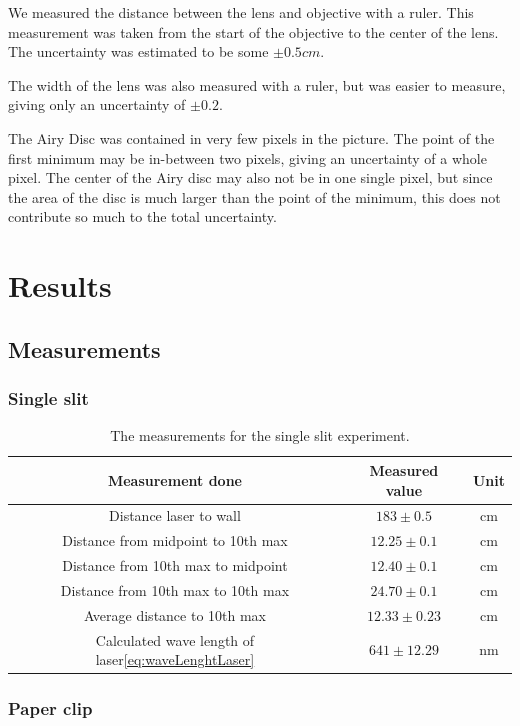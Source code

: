 \documentclass{emulateapj}
\begin{document}
We measured the distance between the lens and objective with a ruler. This measurement was taken from the start of the objective to the center of the lens. The uncertainty was estimated to be some $\pm 0.5 cm$.

The width of the lens was also measured with a ruler, but was easier to measure, giving only an uncertainty of $\pm 0.2$.

The Airy Disc was contained in very few pixels in the picture. The point of the first minimum may be in-between two pixels, giving an uncertainty of a whole pixel. The center of the Airy disc may also not be in one single pixel, but since the area of the disc is much larger than the point of the minimum, this does not contribute so much to the total uncertainty.

\section{Results}
\label{sec:results}

\subsection{Measurements}
\subsubsection{Single slit}

\begin{table}[H]
\begin{tabular}{ c c c }
Measurement done & Measured value & Unit\\
\hline
Distance laser to wall & $183 \pm 0.5$ & cm \\
Distance from midpoint to 10th max & $12.25 \pm 0.1$ & cm\\
Distance from 10th max to midpoint & $12.40 \pm 0.1$ & cm\\
Distance from 10th max to 10th max & $24.70 \pm 0.1$ & cm\\
Average distance to 10th max & $12.33 \pm 0.23$ & cm\\
Calculated wave length of laser\eqref{eq:waveLenghtLaser} & $641 \pm 12.29$ &nm 
\end{tabular}
\caption{The measurements for the single slit experiment.}
\end{table}\label{tab:dataSingleSlit}

\subsubsection{Paper clip}
\end{document}
